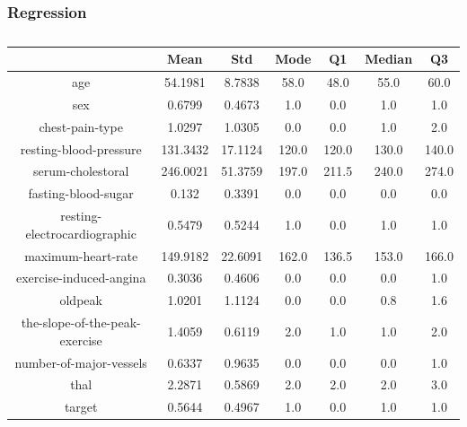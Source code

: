 \documentclass{classrep}
\begin{document}
{{{            }

            \subsubsection{Regression}
            \label{results:5-percent:regression} {
                \begin{table}[!htbp]
                    \centering
                    \begin{tabular}{|c|c|c|c|c|c|c|}
                        \hline
                        & Mean & Std & Mode & Q1 & Median & Q3 \\ \hline
                        age & 54.1981 & 8.7838 & 58.0 & 48.0 & 55.0 & 60.0 \\ \hline
                        sex & 0.6799 & 0.4673 & 1.0 & 0.0 & 1.0 & 1.0 \\ \hline
                        chest-pain-type & 1.0297 & 1.0305 & 0.0 & 0.0 & 1.0 & 2.0 \\ \hline
                        resting-blood-pressure & 131.3432 & 17.1124 & 120.0 & 120.0 & 130.0 & 140.0 \\ \hline
                        serum-cholestoral & 246.0021 & 51.3759 & 197.0 & 211.5 & 240.0 & 274.0 \\ \hline
                        fasting-blood-sugar & 0.132 & 0.3391 & 0.0 & 0.0 & 0.0 & 0.0 \\ \hline
                        resting-electrocardiographic & 0.5479 & 0.5244 & 1.0 & 0.0 & 1.0 & 1.0 \\ \hline
                        maximum-heart-rate & 149.9182 & 22.6091 & 162.0 & 136.5 & 153.0 & 166.0 \\ \hline
                        exercise-induced-angina & 0.3036 & 0.4606 & 0.0 & 0.0 & 0.0 & 1.0 \\ \hline
                        oldpeak & 1.0201 & 1.1124 & 0.0 & 0.0 & 0.8 & 1.6 \\ \hline
                        the-slope-of-the-peak-exercise & 1.4059 & 0.6119 & 2.0 & 1.0 & 1.0 & 2.0 \\ \hline
                        number-of-major-vessels & 0.6337 & 0.9635 & 0.0 & 0.0 & 0.0 & 1.0 \\ \hline
                        thal & 2.2871 & 0.5869 & 2.0 & 2.0 & 2.0 & 3.0 \\ \hline
                        target & 0.5644 & 0.4967 & 1.0 & 0.0 & 1.0 & 1.0 \\ \hline
                    \end{tabular}
                    \caption{}
                    \label{result_5_Regression}
                \end{table}
                \FloatBarrier

}}}
\end{document}
